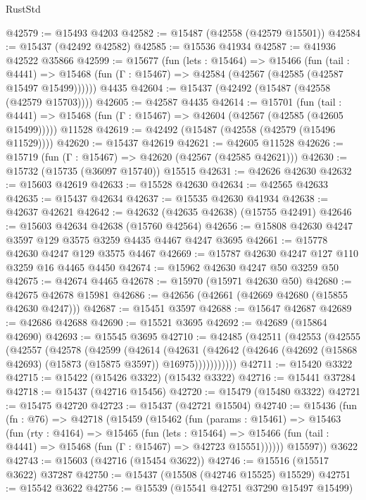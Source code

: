 \begin{lexlean}{RustStd}
\begin{coremodule}
@42579 := @15493 @4203
@42582 := @15487 (@42558 (@42579 @15501))
@42584 := @15437 (@42492 @42582)
@42585 := @15536 @41934
@42587 := @41936 @42522 @35866
@42599 := @15677
    (fun (lets : @15464) =>
    @15466
      (fun (tail : @4441) =>
      @15468 (fun (Γ : @15467) => @42584 (@42567 (@42585 (@42587 @15497 @15499))))))
    @4435
@42604 := @15437 (@42492 (@15487 (@42558 (@42579 @15703))))
@42605 := @42587 @4435
@42614 := @15701
    (fun (tail : @4441) => @15468 (fun (Γ : @15467) => @42604 (@42567 (@42585 (@42605 @15499)))))
    @11528
@42619 := @42492 (@15487 (@42558 (@42579 (@15496 @11529))))
@42620 := @15437 @42619
@42621 := @42605 @11528
@42626 := @15719 (fun (Γ : @15467) => @42620 (@42567 (@42585 @42621)))
@42630 := @15732 (@15735 (@36097 @15740)) @15515
@42631 := @42626 @42630
@42632 := @15603 @42619
@42633 := @15528 @42630
@42634 := @42565 @42633
@42635 := @15437 @42634
@42637 := @15535 @42630 @41934
@42638 := @42637 @42621
@42642 := @42632 (@42635 @42638) (@15755 @42491)
@42646 := @15603 @42634 @42638 (@15760 @42564)
@42656 := @15808 @42630 @4247 @3597 @129 @3575 @3259 @4435 @4467 @4247 @3695
@42661 := @15778 @42630 @4247 @129 @3575 @4467
@42669 := @15787 @42630 @4247 @127 @110 @3259 @16 @4465 @4450
@42674 := @15962 @42630 @4247 @50 @3259 @50
@42675 := @42674 @4465
@42678 := @15970 (@15971 @42630 @50)
@42680 := @42675 @42678 @15981
@42686 := @42656 (@42661 (@42669 @42680 (@15855 @42630 @4247)))
@42687 := @15451 @3597
@42688 := @15647 @42687
@42689 := @42686 @42688
@42690 := @15521 @3695
@42692 := @42689 (@15864 @42690)
@42693 := @15545 @3695
@42710 := @42485
    (@42511
      (@42553
        (@42555
          (@42557
            (@42578
              (@42599
                (@42614
                  (@42631
                    (@42642
                      (@42646 (@42692 (@15868 @42693) (@15873 (@15875 @3597)) @16975)))))))))))
@42711 := @15420 @3322
@42715 := @15422 (@15426 @3322) (@15432 @3322)
@42716 := @15441 @37284
@42718 := @15437 (@42716 @15456)
@42720 := @15479 (@15480 @3322)
@42721 := @15475 @42720
@42723 := @15437 (@42721 @15504)
@42740 := @15436
    (fun (fn : @76) =>
    @42718
      (@15459
        (@15462
          (fun (params : @15461) =>
          @15463
            (fun (rty : @4164) =>
            @15465
              (fun (lets : @15464) =>
              @15466 (fun (tail : @4441) => @15468 (fun (Γ : @15467) => @42723 @15551))))))
        @15597))
    @3622
@42743 := @15603 (@42716 (@15454 @3622))
@42746 := @15516 (@15517 @3622) @37287
@42750 := @15437 (@15508 (@42746 @15525) @15529)
@42751 := @15542 @3622
@42756 := @15539 (@15541 @42751 @37290 @15497 @15499)

\end{coremodule}
\end{lexlean}
